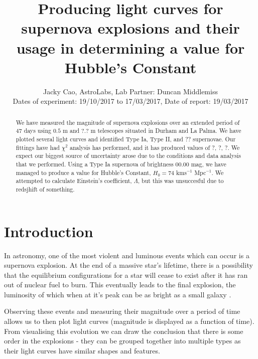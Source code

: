 \documentclass[twocolumn]{revtex4}
\begin{document}
\textheight=26.385cm

\title{Producing light curves for supernova explosions and their usage in determining a value for Hubble's Constant}
 
\author{Jacky Cao, AstroLabs, Lab Partner: Duncan Middlemiss \\ Dates of experiment: 19/10/2017 to 17/03/2017, Date of report: 19/03/2017}

\begin{abstract}              
We have measured the magnitude of supernova explosions over an extended period of 47 days using $0.5$ m and $?.?$ m telescopes situated in Durham and La Palma. We have plotted several light curves and identified Type Ia, Type II, and ?? supernovae. Our fittings have had $\chi^2$ analysis has performed, and it has produced values of ?, ?, ?. We expect our biggest source of uncertainty arose due to the conditions and data analysis that we performed. Using a Type Ia supernova of brightness $00.00$ mag, we have managed to produce a value for Hubble's Constant, $H_0 = 74$ kms$^{-1}$ Mpc$^{-1}$. We attempted to calculate Einstein's coefficient, $\Lambda$, but this was unsuccesful due to redsjhift of something.
\end{abstract}

\maketitle

\vspace{-3ex}
\section{Introduction} 
\vspace{-2ex}

In astronomy, one of the most violent and luminous events which can occur is a supernova explosion. At the end of a massive star's lifetime, there is a possibility that the equilibrium configurations for a star will cease to exist after it has ran out of nuclear fuel to burn. This eventually leads to the final explosion, the luminosity of which when at it's peak can be as bright as a small galaxy \cite{longair}.

Observing these events and measuring their magnitude over a period of time allows us to then plot light curves (magnitude is displayed as a function of time). From visualising this evolution we can draw the conclusion that there is some order in the explosions - they can be grouped together into multiple types as their light curves have similar shapes and features.
\end{document}
